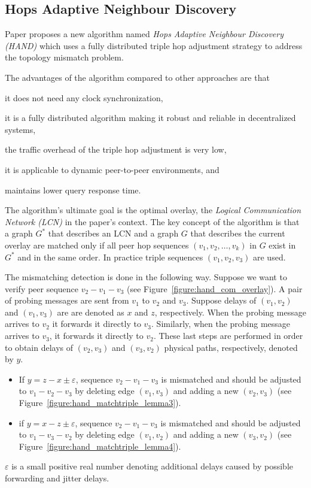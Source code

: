 \documentclass[a4paper,10pt]{article}
\begin{document}
\subsection{Hops Adaptive Neighbour Discovery}
Paper \cite{chen_hand_2006} proposes a new algorithm named \emph{Hops Adaptive Neighbour Discovery (HAND)} which uses a fully distributed triple hop adjustment strategy to address the topology mismatch problem.

The advantages of the algorithm compared to other approaches are that
\begin{inparaenum}
  \item it does not need any clock synchronization,
  \item it is a fully distributed algorithm making it robust and reliable in decentralized systems,
  \item the traffic overhead of the triple hop adjustment is very low,
  \item it is applicable to dynamic peer-to-peer environments, and
  \item maintains lower query response time.
\end{inparaenum}

The algorithm's ultimate goal is the optimal overlay, the \emph{Logical Communication Network (LCN)} in the paper's context. The key concept of the algorithm is that a graph $G^{*}$ that describes an LCN and a graph $G$ that describes the current overlay are matched only if all peer hop sequences $(v_1, v_2, \ldots, v_k)$ in $G$ exist in $G^{*}$ and in the same order. In practice triple sequences $(v_1, v_2, v_3)$ are used.

The mismatching detection is done in the following way. Suppose we want to verify peer sequence $v_2-v_1-v_3$ (see Figure~\ref{figure:hand_com_overlay}). A pair of probing messages are sent from $v_1$ to $v_2$ and $v_3$. Suppose delays of $(v_1,v_2)$ and $(v_1,v_3)$ are are denoted as $x$ and $z$, respectively. When the probing message arrives to $v_2$ it forwards it directly to $v_3$. Similarly, when the probing message arrives to $v_3$, it forwards it directly to $v_2$. These last steps are performed in order to obtain delays of $(v_2,v_3)$ and $(v_3,v_2)$ physical paths, respectively, denoted by $y$.
\begin{itemize}
  \item If $y=z-x\pm\varepsilon$, sequence $v_2-v_1-v_3$ is mismatched and should be adjusted to $v_1-v_2-v_3$ by deleting edge $(v_1,v_3)$ and adding a new $(v_2,v_3)$ (see Figure~\ref{figure:hand_matchtriple_lemma3}).
  \item if $y=x-z\pm\varepsilon$, sequence $v_2-v_1-v_3$ is mismatched and should be adjusted to $v_1-v_3-v_2$ by deleting edge $(v_1,v_2)$ and adding a new $(v_3,v_2)$ (see Figure~\ref{figure:hand_matchtriple_lemma4}).
\end{itemize}
$\varepsilon$ is a small positive real number denoting additional delays caused by possible forwarding and jitter delays.
\end{document}
